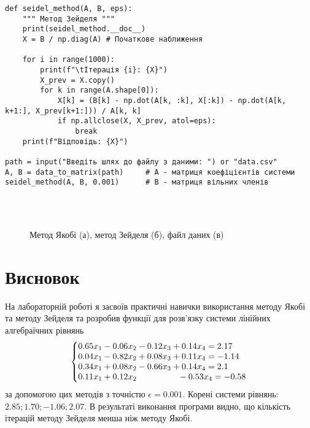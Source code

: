 \documentclass{article}
\begin{document}
\begin{large}
\begin{lstlisting}
def seidel_method(A, B, eps):
	""" Метод Зейделя """
	print(seidel_method.__doc__)
	X = B / np.diag(A) # Початкове наближення
	
	for i in range(1000):
		print(f"\tІтерація {i}: {X}")
		X_prev = X.copy()
		for k in range(A.shape[0]):
			X[k] = (B[k] - np.dot(A[k, :k], X[:k]) - np.dot(A[k, k+1:], X_prev[k+1:])) / A[k, k]
			if np.allclose(X, X_prev, atol=eps):
				break
	print(f"Відповідь: {X}")

path = input("Введіть шлях до файлу з даними: ") or "data.csv"
A, B = data_to_matrix(path)     # A - матриця коефіцієнтів системи
seidel_method(A, B, 0.001)      # B - матриця вільних членів\end{lstlisting}
		
		\begin{figure}[h!]
			\centering
			\subfigure[]{\texttt{[image: 1]}}\\
			\subfigure[]{\texttt{[image: 2]}}\\
			\subfigure[]{\texttt{[image: 3]}}
			\caption{Метод Якобі (а), метод Зейделя (б), файл даних (в)}
		\end{figure}
		
		\section*{Висновок}
			На лабораторній роботі я засвоїв практичні навички використання методу Якобі та методу Зейделя та розробив функції для розв’язку системи лінійних алгебраїчних рівнянь 
			\begin{gather}\nonumber
				\left\{\begin{array}{@{}l@{}}
					0.65x_1-0.06x_2-0.12x_3+0.14x_4=2.17\\\nonumber
					0.04x_1-0.82x_2+0.08x_3+0.11x_4=-1.14\\\nonumber
					0.34x_1+0.08x_2-0.66x_3+0.14x_4=2.1\\\nonumber
					0.11x_1+0.12x_2\hspace{48pt}-0.53x_4=-0.58\nonumber
				\end{array}\right.\,
			\end{gather}
			за допомогою цих методів з точністю $\epsilon=0.001$. Корені системи рівнянь: $2.85; 1.70; -1.06; 2.07$. В результаті виконання програми видно, що кількість ітерацій методу Зейделя менша ніж методу Якобі.
	\end{large}
\end{document}
